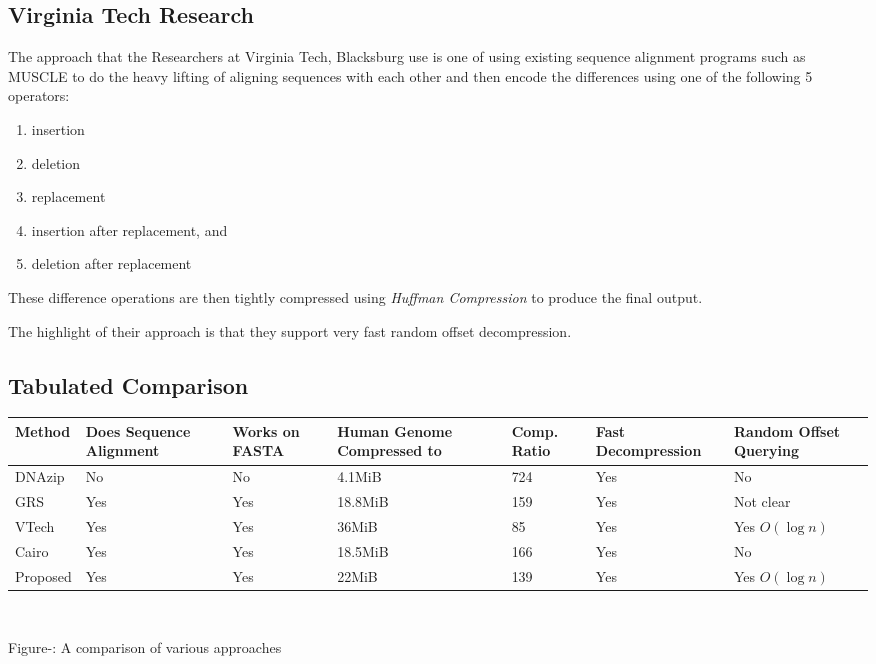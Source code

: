 \documentclass[11pt]{article}
\begin{document}
\subsection{Virginia Tech Research}

The approach that the Researchers at Virginia Tech,
Blacksburg\cite{vtechresearch} use is one of using existing sequence
alignment programs such as MUSCLE\cite{muscle} to do the heavy lifting
of aligning sequences with each other and then encode the differences
using one of the following 5 operators:
\begin{enumerate}
\item insertion
\item deletion
\item replacement
\item insertion after replacement, and
\item deletion after replacement
\end{enumerate}

These difference operations are then tightly compressed using
\textit{Huffman Compression} to produce the final output.

The highlight of their approach is that they support very fast random
offset decompression.

\subsection{Tabulated Comparison}

\begin{center}
  \begin{tabular}{|p{0.6in}|p{0.7in}|p{0.5in}|p{0.8in}|p{0.5in}|p{0.9in}|p{0.9in}|}
    \hline
    Method & Does Sequence Alignment & Works on FASTA & Human Genome
    Compressed to & Comp. Ratio & Fast Decompression & Random
    Offset Querying\\
    \hline
    DNAzip & No & No & 4.1MiB & 724 & Yes & No\\
    \hline
    GRS & Yes & Yes & 18.8MiB & 159 & Yes & Not clear\\
    \hline
    VTech & Yes & Yes & 36MiB & 85 & Yes & Yes $O(\log{n})$\\
    \hline
    Cairo & Yes & Yes & 18.5MiB & 166 & Yes & No\\
    \hline
    Proposed & Yes & Yes & 22MiB & 139 & Yes & Yes $O(\log{n})$\\
    \hline
  \end{tabular}\\
  \vspace{0.3cm}

  \addtocounter{figure}{1}
  \footnotesize{Figure-: A comparison of various
    approaches}

\end{center}
\end{document}
